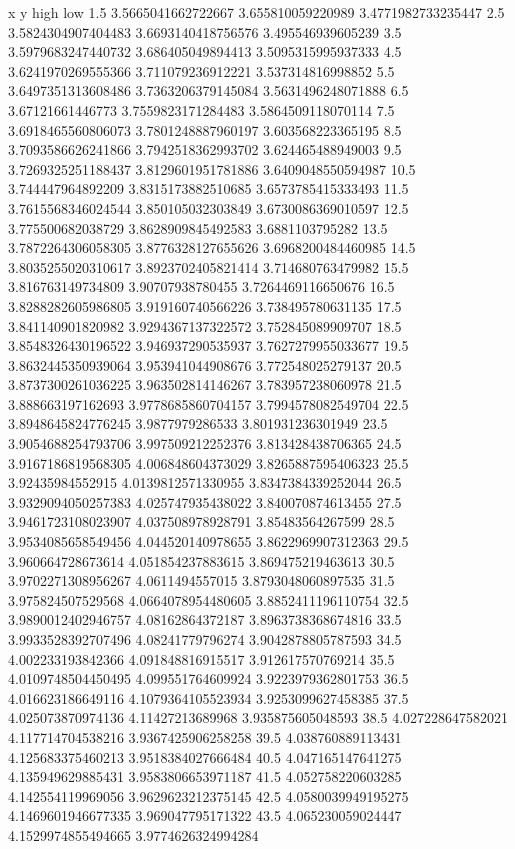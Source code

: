 x   y   high    low
1.5 3.5665041662722667 3.655810059220989 3.4771982733235447
2.5 3.5824304907404483 3.6693140418756576 3.495546939605239
3.5 3.5979683247440732 3.686405049894413 3.5095315995937333
4.5 3.6241970269555366 3.711079236912221 3.537314816998852
5.5 3.6497351313608486 3.7363206379145084 3.5631496248071888
6.5 3.67121661446773 3.7559823171284483 3.5864509118070114
7.5 3.6918465560806073 3.7801248887960197 3.603568223365195
8.5 3.7093586626241866 3.7942518362993702 3.624465488949003
9.5 3.7269325251188437 3.8129601951781886 3.6409048550594987
10.5 3.744447964892209 3.8315173882510685 3.6573785415333493
11.5 3.7615568346024544 3.850105032303849 3.6730086369010597
12.5 3.775500682038729 3.8628909845492583 3.6881103795282
13.5 3.7872264306058305 3.8776328127655626 3.6968200484460985
14.5 3.8035255020310617 3.8923702405821414 3.714680763479982
15.5 3.816763149734809 3.90707938780455 3.7264469116650676
16.5 3.8288282605986805 3.919160740566226 3.738495780631135
17.5 3.841140901820982 3.9294367137322572 3.752845089909707
18.5 3.8548326430196522 3.946937290535937 3.7627279955033677
19.5 3.8632445350939064 3.953941044908676 3.772548025279137
20.5 3.8737300261036225 3.963502814146267 3.783957238060978
21.5 3.888663197162693 3.9778685860704157 3.7994578082549704
22.5 3.8948645824776245 3.9877979286533 3.801931236301949
23.5 3.9054688254793706 3.997509212252376 3.813428438706365
24.5 3.9167186819568305 4.006848604373029 3.8265887595406323
25.5 3.92435984552915 4.0139812571330955 3.8347384339252044
26.5 3.9329094050257383 4.025747935438022 3.840070874613455
27.5 3.9461723108023907 4.037508978928791 3.85483564267599
28.5 3.9534085658549456 4.044520140978655 3.8622969907312363
29.5 3.960664728673614 4.051854237883615 3.869475219463613
30.5 3.9702271308956267 4.0611494557015 3.8793048060897535
31.5 3.975824507529568 4.0664078954480605 3.8852411196110754
32.5 3.9890012402946757 4.08162864372187 3.8963738368674816
33.5 3.9933528392707496 4.08241779796274 3.9042878805787593
34.5 4.002233193842366 4.091848816915517 3.912617570769214
35.5 4.0109748504450495 4.099551764609924 3.9223979362801753
36.5 4.016623186649116 4.1079364105523934 3.9253099627458385
37.5 4.025073870974136 4.11427213689968 3.935875605048593
38.5 4.027228647582021 4.117714704538216 3.9367425906258258
39.5 4.038760889113431 4.125683375460213 3.9518384027666484
40.5 4.047165147641275 4.135949629885431 3.9583806653971187
41.5 4.052758220603285 4.142554119969056 3.9629623212375145
42.5 4.0580039949195275 4.1469601946677335 3.969047795171322
43.5 4.065230059024447 4.1529974855494665 3.9774626324994284
